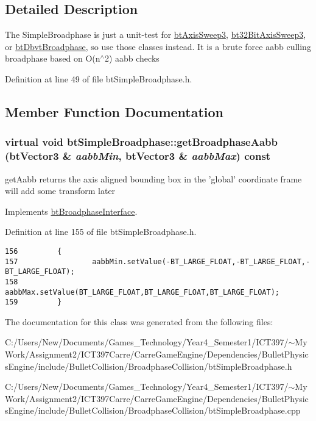 \subsection{Detailed Description}
The SimpleBroadphase is just a unit-test for \hyperlink{classbt_axis_sweep3}{btAxisSweep3}, \hyperlink{classbt32_bit_axis_sweep3}{bt32BitAxisSweep3}, or \hyperlink{structbt_dbvt_broadphase}{btDbvtBroadphase}, so use those classes instead. It is a brute force aabb culling broadphase based on O(n$^\wedge$2) aabb checks 

Definition at line 49 of file btSimpleBroadphase.h.

\subsection{Member Function Documentation}
\hypertarget{classbt_simple_broadphase_8753363773ebbfeb48f8cf5594429dc2}{
\subsubsection[getBroadphaseAabb]{\setlength{\rightskip}{0pt plus 5cm}virtual void btSimpleBroadphase::getBroadphaseAabb (btVector3 \& {\em aabbMin}, \/  btVector3 \& {\em aabbMax}) const}}
\label{classbt_simple_broadphase_8753363773ebbfeb48f8cf5594429dc2}


getAabb returns the axis aligned bounding box in the 'global' coordinate frame will add some transform later 

Implements \hyperlink{classbt_broadphase_interface_b5af9e26414f5a72a76040b8fab4d9e2}{btBroadphaseInterface}.

Definition at line 155 of file btSimpleBroadphase.h.

\begin{Code}\begin{verbatim}156         {
157                 aabbMin.setValue(-BT_LARGE_FLOAT,-BT_LARGE_FLOAT,-BT_LARGE_FLOAT);
158                 aabbMax.setValue(BT_LARGE_FLOAT,BT_LARGE_FLOAT,BT_LARGE_FLOAT);
159         }
\end{verbatim}
\end{Code}




The documentation for this class was generated from the following files:\begin{CompactItemize}
\item 
C:/Users/New/Documents/Games\_\-Technology/Year4\_\-Semester1/ICT397/$\sim$My Work/Assignment2/ICT397Carre/CarreGameEngine/Dependencies/BulletPhysicsEngine/include/BulletCollision/BroadphaseCollision/btSimpleBroadphase.h\item 
C:/Users/New/Documents/Games\_\-Technology/Year4\_\-Semester1/ICT397/$\sim$My Work/Assignment2/ICT397Carre/CarreGameEngine/Dependencies/BulletPhysicsEngine/include/BulletCollision/BroadphaseCollision/btSimpleBroadphase.cpp\end{CompactItemize}
